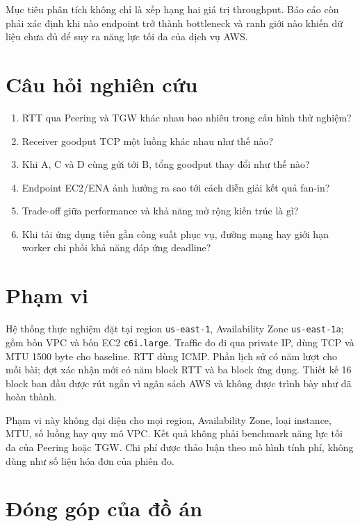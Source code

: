 Mục tiêu phân tích không chỉ là xếp hạng hai giá trị throughput. Báo cáo còn
phải xác định khi nào endpoint trở thành bottleneck và ranh giới nào khiến dữ
liệu chưa đủ để suy ra năng lực tối đa của dịch vụ AWS.

\section{Câu hỏi nghiên cứu}

\begin{enumerate}
  \item RTT qua Peering và TGW khác nhau bao nhiêu trong cấu hình thử nghiệm?
  \item Receiver goodput TCP một luồng khác nhau như thế nào?
  \item Khi A, C và D cùng gửi tới B, tổng goodput thay đổi như thế nào?
  \item Endpoint EC2/ENA ảnh hưởng ra sao tới cách diễn giải kết quả fan-in?
  \item Trade-off giữa performance và khả năng mở rộng kiến trúc là gì?
  \item Khi tải ứng dụng tiến gần công suất phục vụ, đường mạng hay giới hạn
        worker chi phối khả năng đáp ứng deadline?
\end{enumerate}

\section{Phạm vi}

Hệ thống thực nghiệm đặt tại region \texttt{us-east-1}, Availability Zone
\texttt{us-east-1a}; gồm bốn VPC và bốn EC2 \texttt{c6i.large}. Traffic đo đi
qua private IP, dùng TCP và MTU 1500 byte cho baseline. RTT dùng ICMP. Phần
lịch sử có năm lượt cho mỗi bài; đợt xác nhận mới có năm block RTT và ba block
ứng dụng. Thiết kế 16 block ban đầu được rút ngắn vì ngân sách AWS và không
được trình bày như đã hoàn thành.

Phạm vi này không đại diện cho mọi region, Availability Zone, loại instance,
MTU, số luồng hay quy mô VPC. Kết quả không phải benchmark năng lực tối đa của
Peering hoặc TGW. Chi phí được thảo luận theo mô hình tính phí, không dùng như
số liệu hóa đơn của phiên đo.

\section{Đóng góp của đồ án}

